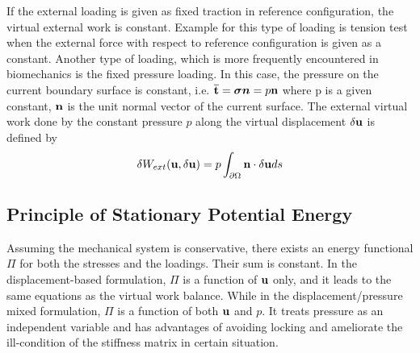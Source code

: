 If the external loading is given as fixed traction in reference configuration, the virtual external work is constant. Example for this type of loading is tension test when the external force with respect to reference configuration is given as a constant. Another type of loading, which is more frequently encountered in biomechanics is the fixed pressure loading.
In this case, the pressure on the current boundary surface is constant, i.e. $\overline{\bold{t}} = \boldsymbol{\sigma{n}} = p\bold{n}$ where p is a given constant, $\bold{n}$ is the unit normal vector of the current surface. The external virtual work done by the constant pressure $p$ along the virtual displacement $\delta{\bold{u}}$ is defined by
\begin{equation} \label{Wext2}
\delta{W_{ext}}(\bold{u}, \delta{\bold{u}}) = p\int_{\partial\Omega} \bold{n}\cdot\delta{\bold{u}}ds
\end{equation}

%
\subsection{Principle of Stationary Potential Energy}
Assuming the mechanical system is conservative, there exists an energy functional $\Pi$ for both the stresses and the loadings. Their sum is constant. In the displacement-based formulation, $\Pi$ is a function of $\bold{u}$ only, and it leads to the same equations as the virtual work balance. While in the displacement/pressure mixed formulation, $\Pi$ is a function of both $\bold{u}$ and $p$. It treats pressure as an independent variable and has advantages of avoiding locking and ameliorate the ill-condition of the stiffness matrix in certain situation.

